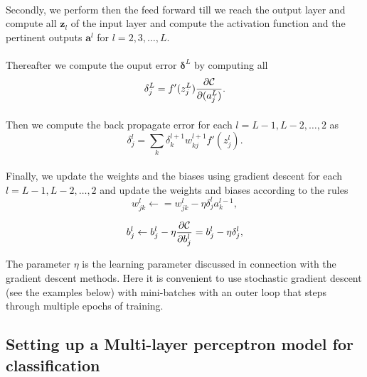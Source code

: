 \documentclass[%
oneside,                 %
final,                   %
10pt]{article}
\begin{document}
\paragraph{}
Secondly, we perform then the feed forward till we reach the output
layer and compute all $\bm{z}_l$ of the input layer and compute the
activation function and the pertinent outputs $\bm{a}^l$ for
$l=2,3,\dots,L$.




\paragraph{}
Thereafter we compute the ouput error $\bm{\delta}^L$ by computing all
\[
\delta_j^L = f'(z_j^L)\frac{\partial {\cal C}}{\partial (a_j^L)}.
\]




\paragraph{}
Then we compute the back propagate error for each $l=L-1,L-2,\dots,2$ as
\[
\delta_j^l = \sum_k \delta_k^{l+1}w_{kj}^{l+1}f'(z_j^l).
\]




\paragraph{}
Finally, we update the weights and the biases using gradient descent for each $l=L-1,L-2,\dots,2$ and update the weights and biases according to the rules
\[
w_{jk}^l\leftarrow  = w_{jk}^l- \eta \delta_j^la_k^{l-1},
\]

\[
b_j^l \leftarrow b_j^l-\eta \frac{\partial {\cal C}}{\partial b_j^l}=b_j^l-\eta \delta_j^l,
\]



The parameter $\eta$ is the learning parameter discussed in connection with the gradient descent methods.
Here it is convenient to use stochastic gradient descent (see the examples below) with mini-batches with an outer loop that steps through multiple epochs of training.

\subsection{Setting up a Multi-layer perceptron model for classification}
\end{document}
